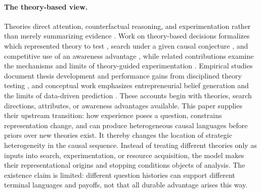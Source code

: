 \documentclass[11pt]{article}
\theoremstyle{definition}
\begin{document}
\paragraph{The theory-based view.}
Theories direct attention, counterfactual reasoning, and experimentation rather than merely summarizing evidence \citep{FelinZenger2017}.
Work on theory-based decisions formalizes which represented theory to test \citep{CamuffoEtAl2024}, search under a given causal conjecture \citep{ChavdaGansStern2024}, and competitive use of an awareness advantage \citep{EhrigZenger2024}, while related contributions examine the mechanisms and limits of theory-guided experimentation \citep{FelinGambardellaZenger2024,Sorenson2024,AdnerLevinthal2024}.
Empirical studies document thesis development and performance gains from disciplined theory testing \citep{OttHannah2024,CamuffoEtAl2020}, and conceptual work emphasizes entrepreneurial belief generation and the limits of data-driven prediction \citep{ZellwegerZenger2023,FelinHolweg2024}.
These accounts begin with theories, search directions, attributes, or awareness advantages available.
This paper supplies their upstream transition: how experience poses a question, constrains representation change, and can produce heterogeneous causal languages before priors over new theories exist.
It thereby changes the location of strategic heterogeneity in the causal sequence.
Instead of treating different theories only as inputs into search, experimentation, or resource acquisition, the model makes their representational origins and stopping conditions objects of analysis.
The existence claim is limited: different question histories can support different terminal languages and payoffs, not that all durable advantage arises this way.
\end{document}
